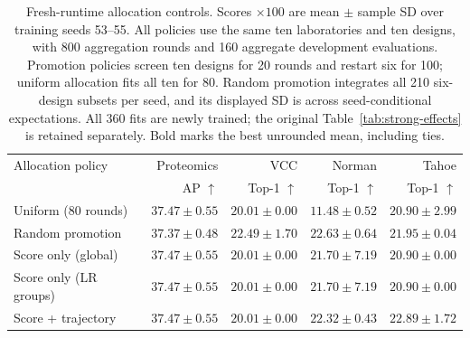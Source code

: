 \begin{table}[htbp]
\caption{Fresh-runtime allocation controls. Scores $\times100$ are mean $\pm$ sample SD over training seeds 53--55. All policies use the same ten laboratories and ten designs, with 800 aggregation rounds and 160 aggregate development evaluations. Promotion policies screen ten designs for 20 rounds and restart six for 100; uniform allocation fits all ten for 80. Random promotion integrates all 210 six-design subsets per seed, and its displayed SD is across seed-conditional expectations. All 360 fits are newly trained; the original Table~\ref{tab:strong-effects} is retained separately. Bold marks the best unrounded mean, including ties.}
\label{tab:rebuttal-allocation}
\centering\small
\setlength{\tabcolsep}{4pt}
\begin{tabular}{lrrrr}
\toprule
Allocation policy & Proteomics & VCC & Norman & Tahoe \\
 & AP $\uparrow$ & Top-1 $\uparrow$ & Top-1 $\uparrow$ & Top-1 $\uparrow$ \\
\midrule
Uniform (80 rounds) & $\mathbf{37.47}\pm0.55$ & $20.01\pm0.00$ & $11.48\pm0.52$ & $20.90\pm2.99$ \\
Random promotion & $37.37\pm0.48$ & $\mathbf{22.49}\pm1.70$ & $\mathbf{22.63}\pm0.64$ & $21.95\pm0.04$ \\
Score only (global) & $\mathbf{37.47}\pm0.55$ & $20.01\pm0.00$ & $21.70\pm7.19$ & $20.90\pm0.00$ \\
Score only (LR groups) & $\mathbf{37.47}\pm0.55$ & $20.01\pm0.00$ & $21.70\pm7.19$ & $20.90\pm0.00$ \\
Score + trajectory & $\mathbf{37.47}\pm0.55$ & $20.01\pm0.00$ & $22.32\pm0.43$ & $\mathbf{22.89}\pm1.72$ \\
\bottomrule
\end{tabular}
\end{table}

